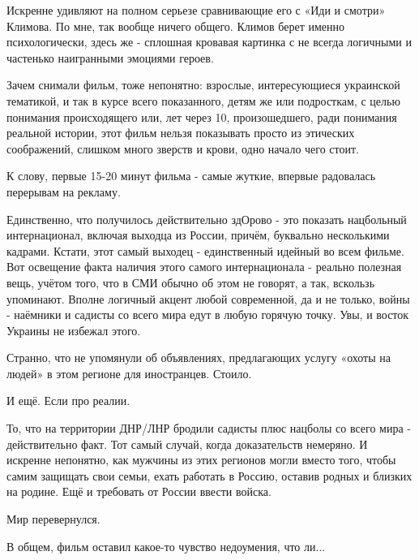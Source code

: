 Искренне удивляют на полном серьезе сравнивающие его с «Иди и смотри» Климова.
По мне, так вообще ничего общего. Климов берет именно психологически, здесь же
- сплошная кровавая картинка с не всегда логичными и частенько наигранными
эмоциями героев. 

Зачем снимали фильм, тоже непонятно: взрослые, интересующиеся украинской
тематикой, и так в курсе всего показанного, детям же или подросткам, с целью
понимания происходящего или, лет через 10, произошедшего, ради понимания
реальной истории, этот фильм нельзя показывать просто из этических соображений,
слишком много зверств и крови, одно начало чего стоит. 

К слову, первые 15-20 минут фильма - самые жуткие, впервые радовалась перерывам
на рекламу. 

Единственно, что получилось действительно здОрово - это показать нацбольный
интернационал, включая выходца из России, причём, буквально несколькими
кадрами. Кстати, этот самый выходец - единственный идейный во всем фильме. Вот
освещение факта наличия этого самого интернационала - реально полезная вещь,
учётом того, что в СМИ обычно об этом не говорят, а так, вскользь упоминают.
Вполне логичный акцент любой современной, да и не только, войны - наёмники и
садисты со всего мира едут в любую горячую точку. Увы, и восток Украины не
избежал этого. 

Странно, что не упомянули об объявлениях, предлагающих услугу «охоты на людей»
в этом регионе для иностранцев. Стоило.

И ещё. Если про реалии.

То, что на территории ДНР/ЛНР бродили садисты плюс нацболы со всего мира -
действительно факт. Тот самый случай, когда доказательств немеряно. И искренне
непонятно, как мужчины из этих регионов могли вместо того, чтобы самим защищать
свои семьи, ехать работать в Россию, оставив родных и близких на родине. Ещё и
требовать от России ввести войска.

Мир перевернулся. 

В общем, фильм оставил какое-то чувство недоумения, что ли...
